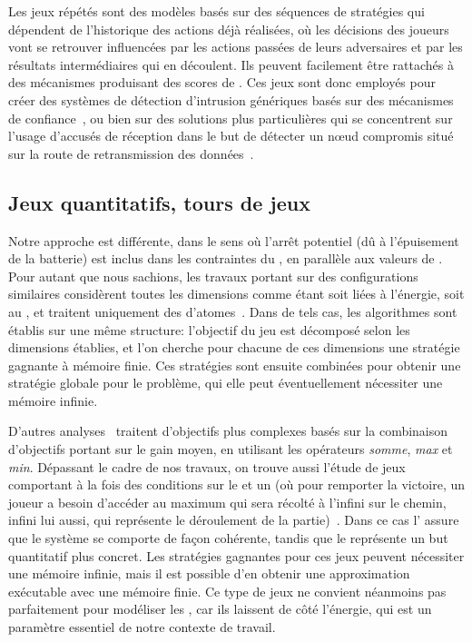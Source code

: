 Les jeux répétés sont des modèles basés sur des séquences de stratégies qui dépendent de l'historique des actions déjà réalisées, où les décisions des joueurs vont se retrouver influencées par les actions passées de leurs adversaires et par les résultats intermédiaires qui en découlent.
Ils peuvent facilement être rattachés à des mécanismes produisant des scores de \reput.
Ces jeux sont donc employés pour créer des systèmes de détection d'intrusion génériques basés sur des mécanismes de confiance~\cite{AD07}, ou bien sur des solutions plus particulières qui se concentrent sur l'usage d'accusés de réception dans le but de détecter un nœud compromis situé sur la route de retransmission des données~\cite{Red09}.

    \subsection{Jeux quantitatifs, tours de jeux}

Notre approche est différente, dans le sens où l'arrêt potentiel (dû à l'épuisement de la batterie) est inclus dans les contraintes du , en parallèle aux valeurs de .
Pour autant que nous sachions, les travaux portant sur des configurations similaires considèrent toutes les dimensions comme étant soit liées à l'énergie, soit au , et traitent uniquement des  d'atomes~\cite{chatterjee12,velner12a}.
Dans de tels cas, les algorithmes sont établis sur une même structure: l'objectif du jeu est décomposé selon les dimensions établies, et l'on cherche pour chacune de ces dimensions une stratégie gagnante à mémoire finie.
Ces stratégies sont ensuite combinées pour obtenir une stratégie globale pour le problème, qui elle peut éventuellement nécessiter une mémoire infinie.

D'autres analyses~\cite{velner12b} traitent d'objectifs plus complexes basés sur la combinaison d'objectifs portant sur le gain moyen, en utilisant les opérateurs \textit{somme}, \textit{max} et \textit{min}.
Dépassant le cadre de nos travaux, on trouve aussi l'étude de jeux comportant à la fois des conditions sur le  et un  (où pour remporter la victoire, un joueur a besoin d'accéder au  maximum qui sera récolté à l'infini sur le chemin, infini lui aussi, qui représente le déroulement de la partie)~\cite{chatterjee05}.
Dans ce cas l' assure que le système se comporte de façon cohérente, tandis que le  représente un but quantitatif plus concret.
Les stratégies gagnantes pour ces jeux peuvent nécessiter une mémoire infinie, mais il est possible d'en obtenir une approximation exécutable avec une mémoire finie.
Ce type de jeux ne convient néanmoins pas parfaitement pour modéliser les \rcs, car ils laissent de côté l'énergie, qui est un paramètre essentiel de notre contexte de travail.

